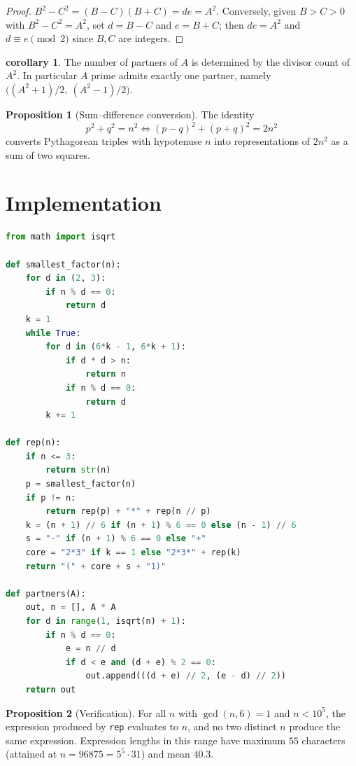 \documentclass[11pt]{article}
\theoremstyle{definition}
\newtheorem{proposition}{Proposition}
\newtheorem{corollary}{corollary}
\begin{document}
\begin{proof}
$B^2-C^2 = (B-C)(B+C) = de = A^2$. Conversely, given $B>C>0$ with
$B^2-C^2=A^2$, set $d=B-C$ and $e=B+C$; then $de=A^2$ and $d\equiv e \pmod 2$
since $B,C$ are integers.
\end{proof}

\begin{corollary}
The number of partners of $A$ is determined by the divisor count of $A^2$. In
particular $A$ prime admits exactly one partner, namely
$\bigl((A^2+1)/2,\ (A^2-1)/2\bigr)$.
\end{corollary}

\begin{proposition}[Sum--difference conversion]
The identity
\[
  p^2 + q^2 = n^2 \iff (p-q)^2 + (p+q)^2 = 2n^2
\]
converts Pythagorean triples with hypotenuse $n$ into representations of
$2n^2$ as a sum of two squares.
\end{proposition}

\section{Implementation}

\begin{lstlisting}[language=Python]
from math import isqrt

def smallest_factor(n):
    for d in (2, 3):
        if n % d == 0:
            return d
    k = 1
    while True:
        for d in (6*k - 1, 6*k + 1):
            if d * d > n:
                return n
            if n % d == 0:
                return d
        k += 1

def rep(n):
    if n <= 3:
        return str(n)
    p = smallest_factor(n)
    if p != n:
        return rep(p) + "*" + rep(n // p)
    k = (n + 1) // 6 if (n + 1) % 6 == 0 else (n - 1) // 6
    s = "-" if (n + 1) % 6 == 0 else "+"
    core = "2*3" if k == 1 else "2*3*" + rep(k)
    return "(" + core + s + "1)"

def partners(A):
    out, n = [], A * A
    for d in range(1, isqrt(n) + 1):
        if n % d == 0:
            e = n // d
            if d < e and (d + e) % 2 == 0:
                out.append(((d + e) // 2, (e - d) // 2))
    return out
\end{lstlisting}

\begin{proposition}[Verification]
For all $n$ with $\gcd(n,6)=1$ and $n < 10^{5}$, the expression produced by
\texttt{rep} evaluates to $n$, and no two distinct $n$ produce the same
expression. Expression lengths in this range have maximum $55$ characters
(attained at $n = 96875 = 5^5\cdot 31$) and mean $40.3$.
\end{proposition}
\end{document}
